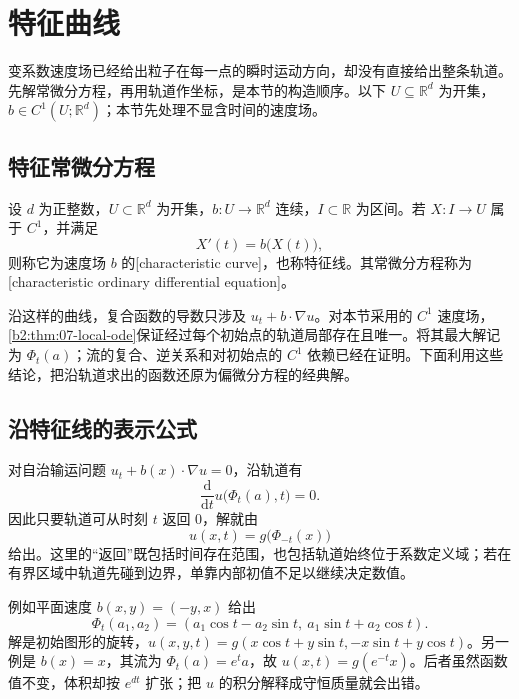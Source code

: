 \section{特征曲线}
\label{b2:sec:0702}

变系数速度场已经给出粒子在每一点的瞬时运动方向，却没有直接给出整条轨道。先解常微分方程，再用轨道作坐标，是本节的构造顺序。以下 \(U\subseteq\mathbb R^d\) 为开集，\(b\in C^1(U;\mathbb R^d)\)；本节先处理不显含时间的速度场。

\subsection{特征常微分方程}
\label{b2:subsec:070201}

\begin{definition}\label{b2:def:07-characteristic}
设 \(d\) 为正整数，\(U\subset\mathbb R^d\) 为开集，\(b:U\to\mathbb R^d\) 连续，\(I\subset\mathbb R\) 为区间。若 \(X:I\rightarrow U\) 属于 \(C^1\)，并满足
\[
 X'(t)=b\bigl(X(t)\bigr),
\]
则称它为速度场 \(b\) 的[characteristic curve]，也称特征线。其常微分方程称为[characteristic ordinary differential equation]。
\end{definition}

沿这样的曲线，复合函数的导数只涉及 \(u_t+b\cdot\nabla u\)。对本节采用的 \(C^1\) 速度场，\cref{b2:thm:07-local-ode}保证经过每个初始点的轨道局部存在且唯一。将其最大解记为 \(\Phi_t(a)\)；流的复合、逆关系和对初始点的 \(C^1\) 依赖已经在证明。下面利用这些结论，把沿轨道求出的函数还原为偏微分方程的经典解。

\subsection{沿特征线的表示公式}
\label{b2:subsec:070203}

对自治输运问题 \(u_t+b(x)\cdot\nabla u=0\)，沿轨道有
\[
 \frac{\mathrm d}{\mathrm dt}u\bigl(\Phi_t(a),t\bigr)=0.
\]
因此只要轨道可从时刻 \(t\) 返回 \(0\)，解就由
\begin{equation}\label{b2:eq:07-autonomous-representation}
 u(x,t)=g\bigl(\Phi_{-t}(x)\bigr)
\end{equation}
给出。这里的“返回”既包括时间存在范围，也包括轨道始终位于系数定义域；若在有界区域中轨道先碰到边界，单靠内部初值不足以继续决定数值。

\ProseParagraphBreak

例如平面速度 \(b(x,y)=(-y,x)\) 给出
\[
 \Phi_t(a_1,a_2)=(a_1\cos t-a_2\sin t,\ a_1\sin t+a_2\cos t).
\]
解是初始图形的旋转，\(u(x,y,t)=g(x\cos t+y\sin t,-x\sin t+y\cos t)\)。另一例是 \(b(x)=x\)，其流为 \(\Phi_t(a)=e^ta\)，故 \(u(x,t)=g(e^{-t}x)\)。后者虽然函数值不变，体积却按 \(e^{dt}\) 扩张；把 \(u\) 的积分解释成守恒质量就会出错。

